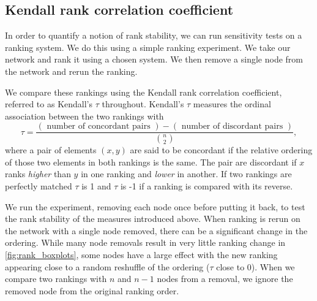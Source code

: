 \subsection{Kendall rank correlation coefficient}

In order to quantify a notion of rank stability, we can run sensitivity tests on a ranking system. We do this using a simple ranking experiment. We take our network and rank it using a chosen system. We then remove a single node from the network and rerun the ranking. 

We compare these rankings using the Kendall rank correlation coefficient, referred to as Kendall's $\tau$ throughout. Kendall's $\tau$ measures the ordinal association between the two rankings with
\begin{equation}
\tau=\frac{(\text { number of concordant pairs })-(\text { number of discordant pairs })}{\binom{n}{2}},
\end{equation}
where a pair of elements $(x,y)$ are said to be concordant if the relative ordering of those two elements in both rankings is the same. The pair are discordant if $x$ ranks \emph{higher} than $y$ in one ranking and \emph{lower} in another.
If two rankings are perfectly matched $\tau$ is 1 and $\tau$ is -1 if a ranking is compared with its reverse. 

We run the experiment, removing each node once before putting it back, to test the rank stability of the measures introduced above. When ranking is rerun on the network with a single node removed, there can be a significant change in the ordering. While many node removals result in very little ranking change in \autoref{fig:rank_boxplots}, some nodes have a large effect with the new ranking appearing close to a random reshuffle of the ordering ($\tau$ close to 0). When we compare two rankings with $n$ and $n-1$ nodes from a removal, we ignore the removed node from the original ranking order.


